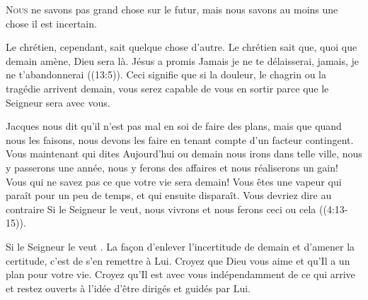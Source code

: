 


\lettrine{N}{ous} ne savons pas grand chose sur le futur,
 mais nous savons au moins une chose\frcolon{} il est incertain. 

Le chrétien, cependant, sait quelque chose d'autre.
 Le chrétien sait que, quoi que demain amène, Dieu sera là.
 Jésus a promis\frcolon{}
 \Og Jamais je ne te délaisserai, jamais, je ne t'abandonnerai \Fg{}
 ((13:5)).
 Ceci signifie que si la douleur, le chagrin ou la tragédie arrivent 
 demain, vous serez capable de vous en sortir
 parce que le Seigneur sera avec vous. 


Jacques nous dit qu'il n'est pas mal en soi de faire des plans,
 mais que quand nous les faisons, nous devons les faire en tenant compte
 d'un facteur contingent.
 \Og Vous maintenant qui dites\frcolon{} Aujourd'hui ou demain nous irons
 dans telle ville, nous y passerons une année, nous y ferons des affaires
 et nous réaliserons un gain! Vous qui ne savez pas ce que votre vie
 sera demain! Vous êtes une vapeur qui paraît pour un peu de temps,
 et qui ensuite disparaît.
 Vous devriez dire au contraire\frcolon{} Si le Seigneur le veut,
 nous vivrons et nous ferons ceci ou cela \Fg{} ((4:13-15)). 

\Og Si le Seigneur le veut \Fg{}. La fa\c{c}on d'enlever l'incertitude de demain
 et d'amener la certitude, c'est de s'en remettre à Lui.
 Croyez que Dieu vous aime et qu'Il a un plan pour votre vie.
 Croyez qu'Il est avec vous indépendamment de ce qui arrive
 \ocadr et restez ouverts à l'idée d'être dirigés et guidés par Lui.

\dvrule





